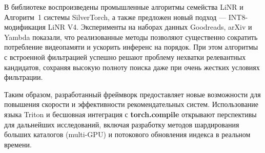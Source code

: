 \documentclass[14pt,a4paper]{extreport}
\numberwithin{figure}{chapter}
\numberwithin{table}{chapter}
\numberwithin{equation}{chapter}
\begin{document}
В библиотеке воспроизведены промышленные алгоритмы семейства LiNR и Алгоритм~1 системы SilverTorch, а также предложен новый подход --- INT8-модификация LiNR V4. Эксперименты на наборах данных Goodreads, arXiv и Yambda показали, что реализованные методы позволяют существенно сократить потребление видеопамяти и ускорить инференс на порядок. При этом алгоритмы с встроенной фильтрацией успешно решают проблему нехватки релевантных кандидатов, сохраняя высокую полноту поиска даже при очень жестких условиях фильтрации.

Таким образом, разработанный фреймворк предоставляет новые возможности для повышения скорости и эффективности рекомендательных систем. Использование языка Triton и бесшовная интеграция с \textbf{torch.compile} открывают перспективы для дальнейших исследований, включая разработку методов шардирования больших каталогов (multi-GPU) и потокового обновления индекса в реальном времени.

\printbibliography[title={Библиографический список}]
\end{document}
